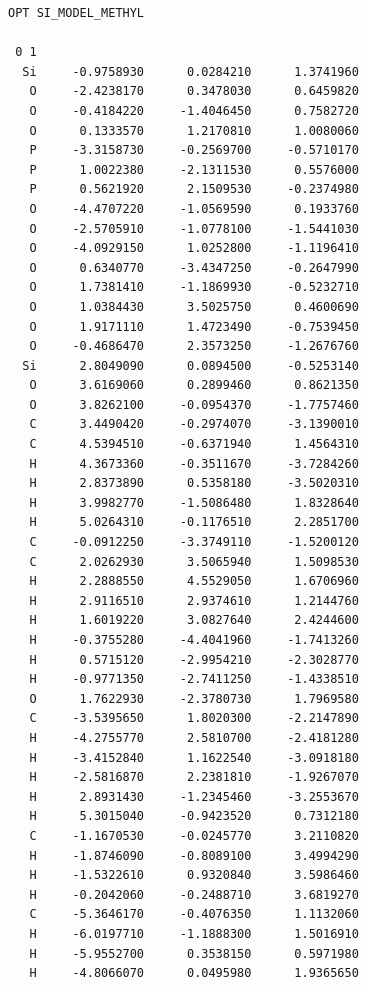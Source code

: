 \documentclass[
  digital, %
  table,   %
  lof,     %
  lot,     %
  oneside,
]{fithesis3}
\begin{document}
 \begin{lstlisting}[frame=single, caption={\ce{SiCH3(PO4(CH3)2)(Si2P2O9(CH3)4)} },label=DescriptiveLabel]
 OPT SI_MODEL_METHYL

 0 1
  Si     -0.9758930      0.0284210      1.3741960
   O     -2.4238170      0.3478030      0.6459820
   O     -0.4184220     -1.4046450      0.7582720
   O      0.1333570      1.2170810      1.0080060
   P     -3.3158730     -0.2569700     -0.5710170
   P      1.0022380     -2.1311530      0.5576000
   P      0.5621920      2.1509530     -0.2374980
   O     -4.4707220     -1.0569590      0.1933760
   O     -2.5705910     -1.0778100     -1.5441030
   O     -4.0929150      1.0252800     -1.1196410
   O      0.6340770     -3.4347250     -0.2647990
   O      1.7381410     -1.1869930     -0.5232710
   O      1.0384430      3.5025750      0.4600690
   O      1.9171110      1.4723490     -0.7539450
   O     -0.4686470      2.3573250     -1.2676760
  Si      2.8049090      0.0894500     -0.5253140
   O      3.6169060      0.2899460      0.8621350
   O      3.8262100     -0.0954370     -1.7757460
   C      3.4490420     -0.2974070     -3.1390010
   C      4.5394510     -0.6371940      1.4564310
   H      4.3673360     -0.3511670     -3.7284260
   H      2.8373890      0.5358180     -3.5020310
   H      3.9982770     -1.5086480      1.8328640
   H      5.0264310     -0.1176510      2.2851700
   C     -0.0912250     -3.3749110     -1.5200120
   C      2.0262930      3.5065940      1.5098530
   H      2.2888550      4.5529050      1.6706960
   H      2.9116510      2.9374610      1.2144760
   H      1.6019220      3.0827640      2.4244600
   H     -0.3755280     -4.4041960     -1.7413260
   H      0.5715120     -2.9954210     -2.3028770
   H     -0.9771350     -2.7411250     -1.4338510
   O      1.7622930     -2.3780730      1.7969580
   C     -3.5395650      1.8020300     -2.2147890
   H     -4.2755770      2.5810700     -2.4181280
   H     -3.4152840      1.1622540     -3.0918180
   H     -2.5816870      2.2381810     -1.9267070
   H      2.8931430     -1.2345460     -3.2553670
   H      5.3015040     -0.9423520      0.7312180
   C     -1.1670530     -0.0245770      3.2110820
   H     -1.8746090     -0.8089100      3.4994290
   H     -1.5322610      0.9320840      3.5986460
   H     -0.2042060     -0.2488710      3.6819270
   C     -5.3646170     -0.4076350      1.1132060
   H     -6.0197710     -1.1888300      1.5016910
   H     -5.9552700      0.3538150      0.5971980
   H     -4.8066070      0.0495980      1.9365650


 \end{lstlisting}
\end{document}
